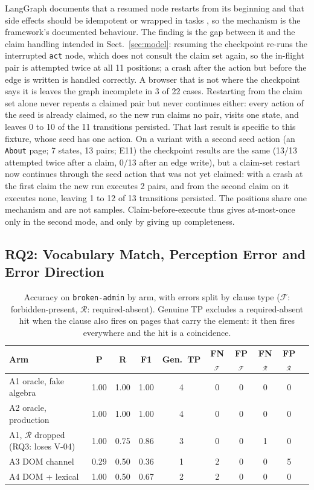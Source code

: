 LangGraph documents that a resumed node restarts from its beginning and that side
effects should be idempotent or wrapped in tasks \cite{langgraph2026durable}, so the
mechanism is the framework's documented behaviour. The finding is the gap between
it and the claim handling intended in Sect.~\ref{sec:model}: resuming the
checkpoint re-runs the interrupted \texttt{act} node, which does not consult the
claim set again, so the in-flight pair is attempted twice at all 11 positions; a
crash after the action but before the edge is written is handled correctly. A
browser that is not where the checkpoint says it is leaves the graph incomplete in
3 of 22 cases. Restarting from the claim set alone never repeats a claimed pair
but never continues either: every action of the seed is already claimed, so the
new run claims no pair, visits one state, and leaves 0 to 10 of the 11 transitions
persisted. That last result is specific to this fixture, whose seed has one
action. On a variant with a second seed action (an \texttt{About} page; 7 states, 13
pairs; E11) the checkpoint results are the same (13/13 attempted twice after a
claim, 0/13 after an edge write), but a claim-set restart now continues through the
seed action that was not yet claimed: with a crash at the first claim the new run
executes 2 pairs, and from the second claim on it executes none, leaving 1 to 12
of 13 transitions persisted. The positions share one mechanism and are not samples. Claim-before-execute thus gives at-most-once only in the
second mode, and only by giving up completeness.

\subsection{RQ2: Vocabulary Match, Perception Error and Error Direction}
\label{sec:rq2}

\begin{table}[tbp]
\caption{Accuracy on \texttt{broken-admin} by arm, with errors split by clause type
($\mathcal F$: forbidden-present, $\mathcal R$: required-absent). Genuine TP excludes
a required-absent hit when the clause also fires on pages that carry the element:
it then fires everywhere and the hit is a coincidence.}
\label{tab:rq2}
\setlength{\tabcolsep}{2.2pt}
\footnotesize
\begin{tabular}{@{}lccccccccc@{}}
\toprule
Arm & P & R & F1 & Gen.\ TP & FN$_\mathcal F$ & FP$_\mathcal F$ & FN$_\mathcal R$ & FP$_\mathcal R$\\
\midrule
A1 oracle, fake algebra & 1.00 & 1.00 & 1.00 & 4 & 0 & 0 & 0 & 0 \\
A2 oracle, production & 1.00 & 1.00 & 1.00 & 4 & 0 & 0 & 0 & 0 \\
A1, $\mathcal R$ dropped (RQ3: loses V-04) & 1.00 & 0.75 & 0.86 & 3 & 0 & 0 & 1 & 0 \\
A3 DOM channel & 0.29 & 0.50 & 0.36 & 1 & 2 & 0 & 0 & 5 \\
A4 DOM + lexical & 1.00 & 0.50 & 0.67 & 2 & 2 & 0 & 0 & 0 \\
\bottomrule
\end{tabular}
\end{table}

